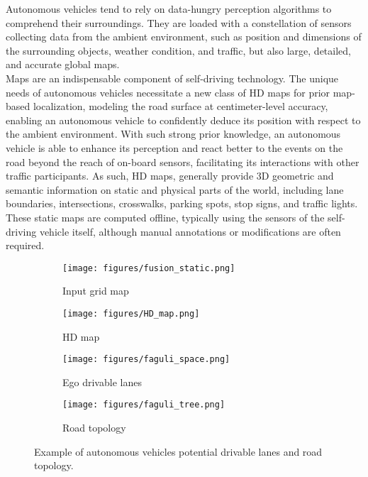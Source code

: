 \documentclass[10pt,twocolumn,letterpaper]{article}
\begin{document}
\label{sect:introduction}
Autonomous vehicles tend to rely on data-hungry perception algorithms to comprehend their surroundings. They are loaded with a constellation of sensors collecting data from the ambient environment, such as position and dimensions of the surrounding objects, weather condition, and traffic, but also large, detailed, and accurate global maps.\\
Maps are an indispensable component of self-driving technology. The unique needs of autonomous vehicles necessitate a new class of HD maps for prior map-based localization, modeling the road surface at centimeter-level accuracy, enabling an autonomous vehicle to confidently deduce its position with respect to the ambient environment. With such strong prior knowledge, an autonomous vehicle is able to enhance its perception and react better to the events on the road beyond the reach of on-board sensors, facilitating its interactions with other traffic participants. As such, HD maps, generally provide 3D geometric and semantic information on static and physical parts of the world, including lane boundaries, intersections, crosswalks, parking spots, stop signs, and traffic lights. These static maps are computed offline, typically using the sensors of the self-driving vehicle itself, although manual annotations or modifications are often required.
\begin{figure}
     \centering
     \begin{subfigure}[b]{0.23\textwidth}
         \centering
         \texttt{[image: figures/fusion\_static.png]}
         \caption{Input grid map}
         \label{fig:inputlayers_overlayed}
     \end{subfigure}
     \begin{subfigure}[b]{0.23\textwidth}
         \centering
         \texttt{[image: figures/HD\_map.png]}
         \caption{HD map}
         \label{fig:hdmap}
     \end{subfigure}
     \begin{subfigure}[b]{0.23\textwidth}
         \centering
         \texttt{[image: figures/faguli\_space.png]}
         \caption{Ego drivable lanes}
         \label{fig:fagulispace}
     \end{subfigure}
     \begin{subfigure}[b]{0.23\textwidth}
         \centering
         \texttt{[image: figures/faguli\_tree.png]}
         \caption{Road topology}
         \label{fig:roadtopology}
     \end{subfigure}
     \caption{Example of autonomous vehicle\textquotesingle s potential drivable lanes and road topology.}
     \label{fig:drivabellanes}
\end{figure}
\end{document}
